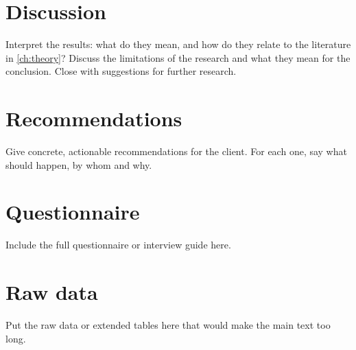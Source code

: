 \documentclass[11pt, a4paper, oneside]{report}
\begin{document}
\chapter{Discussion}
\label{ch:discussion}
Interpret the results: what do they mean, and how do they relate to the
literature in \cref{ch:theory}? Discuss the limitations of the research
and what they mean for the conclusion. Close with suggestions for further
research.

\chapter{Recommendations}
\label{ch:recommendations}
Give concrete, actionable recommendations for the client. For each one,
say what should happen, by whom and why.

\printbibliography[title={References}, heading=bibintoc]

\appendix

\chapter{Questionnaire}
\label{app:questionnaire}
Include the full questionnaire or interview guide here.

\chapter{Raw data}
Put the raw data or extended tables here that would make the main text too
long.
\end{document}
